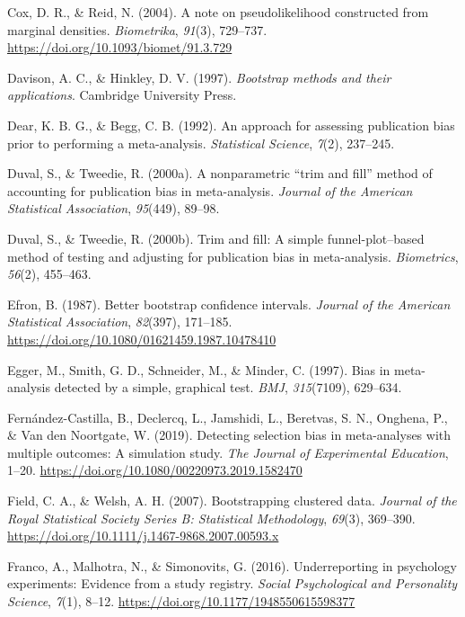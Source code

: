 \documentclass[
  american,
  man, donotrepeattitle,floatsintext]{apa7}
\newlength{\cslhangindent}
\newenvironment{CSLReferences}[2] %
 {\begin{list}{}{%
  \setlength{\itemindent}{0pt}
  \setlength{\leftmargin}{0pt}
  \setlength{\parsep}{0pt}
  \ifodd #1
   \setlength{\leftmargin}{\cslhangindent}
   \setlength{\itemindent}{-1\cslhangindent}
  \fi
  \setlength{\itemsep}{#2\baselineskip}}}
 {\end{list}}
\begin{document}
\begin{CSLReferences}{1}{0}
Cox, D. R., \& Reid, N. (2004). A note on pseudolikelihood constructed from marginal densities. \emph{Biometrika}, \emph{91}(3), 729--737. \url{https://doi.org/10.1093/biomet/91.3.729}

Davison, A. C., \& Hinkley, D. V. (1997). \emph{Bootstrap methods and their applications}. Cambridge University Press.

Dear, K. B. G., \& Begg, C. B. (1992). {An approach for assessing publication bias prior to performing a meta-analysis}. \emph{Statistical Science}, \emph{7}(2), 237--245.

Duval, S., \& Tweedie, R. (2000a). A nonparametric {``trim and fill''} method of accounting for publication bias in meta-analysis. \emph{Journal of the American Statistical Association}, \emph{95}(449), 89--98.

Duval, S., \& Tweedie, R. (2000b). Trim and fill: A simple funnel-plot--based method of testing and adjusting for publication bias in meta-analysis. \emph{Biometrics}, \emph{56}(2), 455--463.

Efron, B. (1987). Better bootstrap confidence intervals. \emph{Journal of the American Statistical Association}, \emph{82}(397), 171--185. \url{https://doi.org/10.1080/01621459.1987.10478410}

Egger, M., Smith, G. D., Schneider, M., \& Minder, C. (1997). Bias in meta-analysis detected by a simple, graphical test. \emph{BMJ}, \emph{315}(7109), 629--634.

Fernández-Castilla, B., Declercq, L., Jamshidi, L., Beretvas, S. N., Onghena, P., \& Van den Noortgate, W. (2019). Detecting selection bias in meta-analyses with multiple outcomes: A simulation study. \emph{The Journal of Experimental Education}, 1--20. \url{https://doi.org/10.1080/00220973.2019.1582470}

Field, C. A., \& Welsh, A. H. (2007). Bootstrapping clustered data. \emph{Journal of the Royal Statistical Society Series B: Statistical Methodology}, \emph{69}(3), 369--390. \url{https://doi.org/10.1111/j.1467-9868.2007.00593.x}

Franco, A., Malhotra, N., \& Simonovits, G. (2016). Underreporting in psychology experiments: Evidence from a study registry. \emph{Social Psychological and Personality Science}, \emph{7}(1), 8--12. \url{https://doi.org/10.1177/1948550615598377}


\end{CSLReferences}
\end{document}
